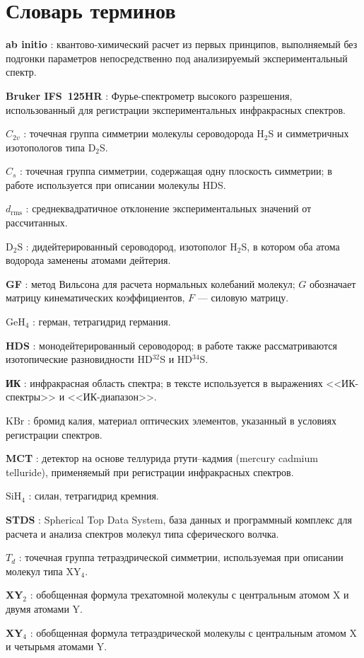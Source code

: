 \chapter*{Словарь терминов}             %

\textbf{ab initio} : квантово-химический расчет из первых принципов, выполняемый без подгонки параметров непосредственно под анализируемый экспериментальный спектр.

\textbf{Bruker IFS~125HR} : Фурье-спектрометр высокого разрешения, использованный для регистрации экспериментальных инфракрасных спектров.

\textbf{\(C_{2v}\)} : точечная группа симметрии молекулы сероводорода H$_2$S и симметричных изотопологов типа D$_2$S.

\textbf{\(C_s\)} : точечная группа симметрии, содержащая одну плоскость симметрии; в работе используется при описании молекулы HDS.

\textbf{\(d_{\mathrm{rms}}\)} : среднеквадратичное отклонение экспериментальных значений от рассчитанных.

\textbf{\(\mathrm{D_2S}\)} : дидейтерированный сероводород, изотополог H$_2$S, в котором оба атома водорода заменены атомами дейтерия.

\textbf{GF} : метод Вильсона для расчета нормальных колебаний молекул; \(G\) обозначает матрицу кинематических коэффициентов, \(F\) --- силовую матрицу.

\textbf{\(\mathrm{GeH_4}\)} : герман, тетрагидрид германия.

\textbf{HDS} : монодейтерированный сероводород; в работе также рассматриваются изотопические разновидности HD$^{32}$S и HD$^{34}$S.

\textbf{ИК} : инфракрасная область спектра; в тексте используется в выражениях <<ИК-спектры>> и <<ИК-диапазон>>.

\textbf{\(\mathrm{KBr}\)} : бромид калия, материал оптических элементов, указанный в условиях регистрации спектров.

\textbf{MCT} : детектор на основе теллурида ртути--кадмия (mercury cadmium telluride), применяемый при регистрации инфракрасных спектров.

\textbf{\(\mathrm{SiH_4}\)} : силан, тетрагидрид кремния.

\textbf{STDS} : Spherical Top Data System, база данных и программный комплекс для расчета и анализа спектров молекул типа сферического волчка.

\textbf{\(T_d\)} : точечная группа тетраэдрической симметрии, используемая при описании молекул типа XY$_4$.

\textbf{XY$_2$} : обобщенная формула трехатомной молекулы с центральным атомом X и двумя атомами Y.

\textbf{XY$_4$} : обобщенная формула тетраэдрической молекулы с центральным атомом X и четырьмя атомами Y.
